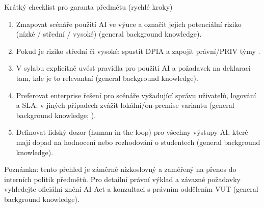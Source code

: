 Krátký checklist pro garanta předmětu (rychlé kroky)
\begin{enumerate}
  \item Zmapovat scénáře použití AI ve výuce a označit jejich potenciální riziko (nízké / střední / vysoké) (general background knowledge).
  \item Pokud je riziko střední či vysoké: spustit DPIA a zapojit právní/PRIV týmy \cite{kb_malinka_chatgpt_ve_vyuce_dva_roky_pote_2024_pdf_90bc3aaf_page_12_1}.
  \item V sylabu explicitně uvést pravidla pro použití AI a požadavek na deklaraci tam, kde je to relevantní (general background knowledge).
  \item Preferovat enterprise řešení pro scénáře vyžadující správu uživatelů, logování a SLA; v jiných případech zvážit lokální/on‑premise variantu (general background knowledge; \cite{kb_ai_101_tipu_pdf_04e4a115_page_15_2}).
  \item Definovat lidský dozor (human‑in‑the‑loop) pro všechny výstupy AI, které mají dopad na hodnocení nebo rozhodování o studentech (general background knowledge).
\end{enumerate}

Poznámka: tento přehled je záměrně nízkoslovný a zaměřený na přenos do interních politik předmětů. Pro detailní právní výklad a závazné požadavky vyhledejte oficiální znění AI Act a konzultaci s právním oddělením VUT (general background knowledge).